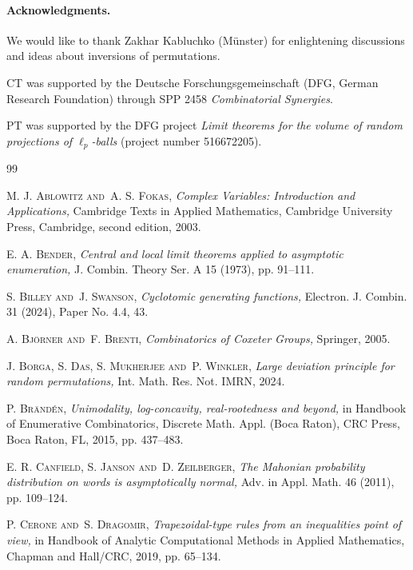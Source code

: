 \documentclass[11pt,a4paper]{scrartcl}
\numberwithin{equation}{section}
\theoremstyle{plain}
\theoremstyle{definition}
\theoremstyle{remark}
\newcommand{\acknowledgements}{\paragraph{Acknowledgments.}}
\begin{document}
\acknowledgements We would like to thank Zakhar Kabluchko (M\"unster) for enlightening discussions and ideas about inversions of permutations. 

CT was supported by the Deutsche Forschungsgemeinschaft (DFG, German Research Foundation) through SPP 2458 \emph{Combinatorial Synergies}.

PT was supported by the DFG project \emph{Limit theorems for the volume of random projections of $\ell_p$-balls} (project number 516672205).

\begingroup
\newcommand{\n}[1]{\textsc{#1}}
\providecommand{\and}{and~}
\renewcommand{\it}{\itshape}

\begin{thebibliography}{99}

\n{M. J. Ablowitz \and A. S. Fokas},
{\it Complex Variables: Introduction and Applications,}
Cambridge Texts in Applied Mathematics, Cambridge University Press, Cambridge, second edition, 2003.

\n{E. A. Bender},
{\it Central and local limit theorems applied to asymptotic enumeration,}
J. Combin. Theory Ser. A 15 (1973), pp. 91--111.

\n{S. Billey \and J. Swanson},
{\it Cyclotomic generating functions,}
Electron. J. Combin. 31 (2024), Paper No. 4.4, 43.

\n{A. Bj\"orner \and F. Brenti},
{\it Combinatorics of Coxeter Groups,}
Springer, 2005.

\n{J. Borga, S. Das, S. Mukherjee \and P. Winkler},
{\it Large deviation principle for random permutations,}
Int. Math. Res. Not. IMRN, 2024.

\n{P. Br\"and\'en},
{\it Unimodality, log-concavity, real-rootedness and beyond,}
in Handbook of Enumerative Combinatorics, Discrete Math. Appl. (Boca Raton), CRC Press, Boca Raton, FL, 2015, pp. 437--483.

\n{E. R. Canfield, S. Janson \and D. Zeilberger},
{\it The Mahonian probability distribution on words is asymptotically normal,}
Adv. in Appl. Math. 46 (2011), pp. 109--124.

\n{P. Cerone \and S. Dragomir},
{\it Trapezoidal-type rules from an inequalities point of view,}
in Handbook of Analytic Computational Methods in Applied Mathematics, Chapman and Hall/CRC, 2019, pp. 65--134.


\end{thebibliography}
\end{document}
